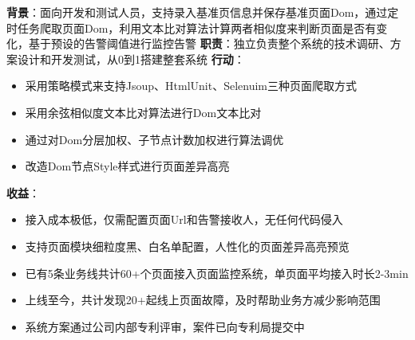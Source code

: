 \documentclass{resume}
\begin{document}
    \begin{onehalfspacing}
        \textbf{背景}：面向开发和测试人员，支持录入基准页信息并保存基准页面Dom，通过定时任务爬取页面Dom，利用文本比对算法计算两者相似度来判断页面是否有变化，基于预设的告警阈值进行监控告警\newline
        \textbf{职责}：独立负责整个系统的技术调研、方案设计和开发测试，从0到1搭建整套系统\newline
        \textbf{行动}：
        \begin{itemize}
            \item 采用策略模式来支持Jsoup、HtmlUnit、Selenuim三种页面爬取方式
            \item 采用余弦相似度文本比对算法进行Dom文本比对
            \item 通过对Dom分层加权、子节点计数加权进行算法调优
            \item 改造Dom节点Style样式进行页面差异高亮
        \end{itemize}
        \textbf{收益}：
        \begin{itemize}
            \item 接入成本极低，仅需配置页面Url和告警接收人，无任何代码侵入
            \item 支持页面模块细粒度黑、白名单配置，人性化的页面差异高亮预览
            \item 已有5条业务线共计60+个页面接入页面监控系统，单页面平均接入时长2-3min
            \item 上线至今，共计发现20+起线上页面故障，及时帮助业务方减少影响范围
            \item 系统方案通过公司内部专利评审，案件已向专利局提交中
        \end{itemize}
    \end{onehalfspacing}
    \blankline{ }
\end{document}

